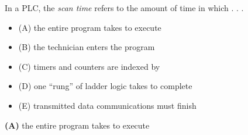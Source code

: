 

In a PLC, the {\it scan time} refers to the amount of time in which . . .

\begin{itemize}
\item{(A)} the entire program takes to execute
\vskip 5pt 
\item{(B)} the technician enters the program
\vskip 5pt 
\item{(C)} timers and counters are indexed by
\vskip 5pt 
\item{(D)} one ``rung'' of ladder logic takes to complete
\vskip 5pt 
\item{(E)} transmitted data communications must finish
\end{itemize}







{\bf (A)} the entire program takes to execute
 










